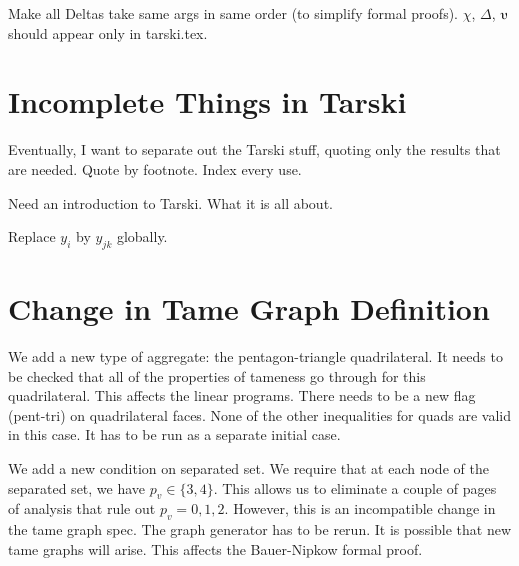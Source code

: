Make all Deltas take same args in same order (to simplify formal proofs).
$\chi$, $\Delta$, $\ups$ should appear only in tarski.tex. 

\section{Incomplete Things in Tarski}

Eventually, I want to separate out the Tarski stuff, quoting
only the results that are needed.  Quote by footnote. Index every use.

Need an introduction to Tarski. What it is all about.

Replace $y_i$ by $y_{jk}$ globally.


\section{Change in Tame Graph Definition}

We add a new type of aggregate: the pentagon-triangle quadrilateral.
It needs to be checked that all of the properties of tameness go
through for this quadrilateral.  This affects the linear programs.
There needs to be a new flag (pent-tri) on quadrilateral faces.
None of the other inequalities for quads are valid in this case.
It has to be run as a separate initial case.

We add a new condition on separated set.  We require that 
at each node of the separated set, we have $p_v\in\{3,4\}$.
This allows us to eliminate a couple of pages of analysis
that rule out $p_v=0,1,2$.  However, this is an incompatible
change in the tame graph spec.  The graph generator has to
be rerun.  It is possible that new tame graphs will arise.
This affects the Bauer-Nipkow formal proof.



